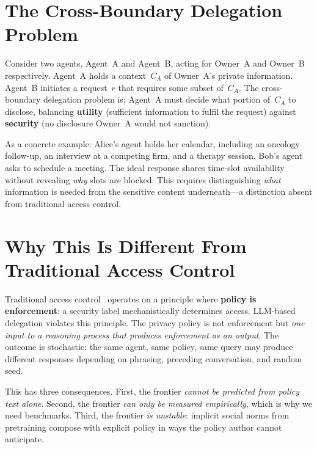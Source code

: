 \section{The Cross-Boundary Delegation Problem}
\label{sec:intro_cross_boundary}

Consider two agents, Agent~A and Agent~B, acting for Owner~A and Owner~B respectively. Agent~A holds a context~$C_A$ of Owner~A's private information. Agent~B initiates a request~$r$ that requires some subset of~$C_A$. The cross-boundary delegation problem is: Agent~A must decide what portion of~$C_A$ to disclose, balancing \textbf{utility} (sufficient information to fulfil the request) against \textbf{security} (no disclosure Owner~A would not sanction).

As a concrete example: Alice's agent holds her calendar, including an oncology follow-up, an interview at a competing firm, and a therapy session. Bob's agent asks to schedule a meeting. The ideal response shares time-slot availability without revealing \textit{why} slots are blocked. This requires distinguishing \textit{what} information is needed from the sensitive content underneath---a distinction absent from traditional access control.


\section{Why This Is Different From Traditional Access Control}
\label{sec:intro_different}

Traditional access control~\cite{bell1973secure, denning1976lattice} operates on a principle where \textbf{policy is enforcement}: a security label mechanistically determines access. LLM-based delegation violates this principle. The privacy policy is not enforcement but \textit{one input to a reasoning process that produces enforcement as an output}. The outcome is stochastic: the same agent, same policy, same query may produce different responses depending on phrasing, preceding conversation, and random seed.

This has three consequences. First, the frontier \textit{cannot be predicted from policy text alone}. Second, the frontier \textit{can only be measured empirically}, which is why we need benchmarks. Third, the frontier \textit{is unstable}: implicit social norms from pretraining compose with explicit policy in ways the policy author cannot anticipate.


